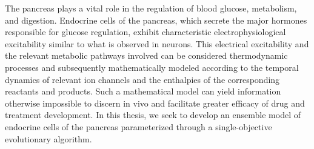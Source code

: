 The pancreas plays a vital role in the regulation of blood glucose, metabolism, and digestion. Endocrine cells of the pancreas, which secrete the major hormones responsible for glucose regulation, exhibit characteristic electrophysiological excitability similar to what is observed in neurons. This electrical excitability and the relevant metabolic pathways involved can be considered thermodynamic processes and subsequently mathematically modeled according to the temporal dynamics of relevant ion channels and the enthalpies of the corresponding reactants and products. Such a mathematical model can yield information otherwise impossible to discern in vivo and facilitate greater efficacy of drug and treatment development. In this thesis, we seek to develop an ensemble model of endocrine cells of the pancreas parameterized through a single-objective evolutionary algorithm.